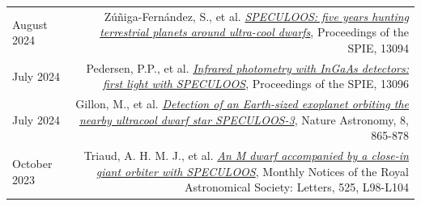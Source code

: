 \documentclass{article}
\begin{document}
\begin{longtable}{L!{\vrule}R}
    August 2024 &
    Zúñiga-Fernández, S., et al.
    \href{https://ui.adsabs.harvard.edu/abs/2024SPIE13094E..13Z/abstract}{\textit{SPECULOOS: five years hunting terrestrial planets around ultra-cool dwarfs}},
    Proceedings of the SPIE, 13094 \\

    July 2024 &
    Pedersen, P.P., et al.
    \href{https://ui.adsabs.harvard.edu/abs/2024SPIE13096E..3XP/abstract}{\textit{Infrared photometry with InGaAs detectors: first light with SPECULOOS}},
    Proceedings of the SPIE, 13096 \\

    July 2024 &
    Gillon, M., et al.
    \href{https://ui.adsabs.harvard.edu/abs/2024NatAs...8..865G/abstract}{\textit{Detection of an Earth-sized exoplanet orbiting the nearby ultracool dwarf star SPECULOOS-3}},
    Nature Astronomy, 8, 865-878 \\

    October 2023 &
    Triaud, A. H. M. J., et al.
    \href{https://ui.adsabs.harvard.edu/abs/2023MNRAS.525L..98T/abstract}{\textit{An M dwarf accompanied by a close-in giant orbiter with SPECULOOS}},
    Monthly Notices of the Royal Astronomical Society: Letters, 525, L98-L104 \\

\end{longtable}
\end{document}
